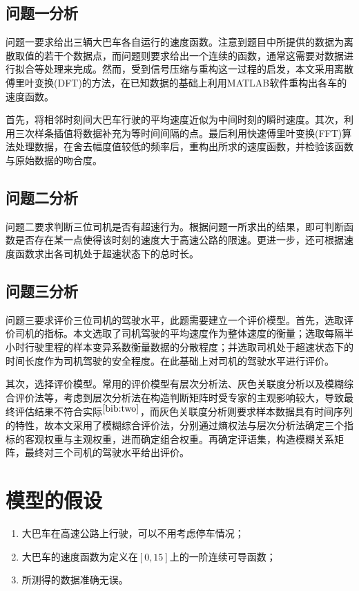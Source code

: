 \documentclass[bwprint]{cumcmthesis}
\begin{document}
        \subsection{问题一分析}
        问题一要求给出三辆大巴车各自运行的速度函数。注意到题目中所提供的数据为离散取值的若干个数据点，而问题则要求给出一个连续的函数，通常这需要对数据进行拟合等处理来完成。然而，受到信号压缩与重构这一过程的启发，本文采用离散傅里叶变换(DFT)的方法，在已知数据的基础上利用MATLAB软件重构出各车的速度函数。

        首先，将相邻时刻间大巴车行驶的平均速度近似为中间时刻的瞬时速度。其次，利用三次样条插值将数据补充为等时间间隔的点。最后利用快速傅里叶变换(FFT)算法处理数据，在舍去幅度值较低的频率后，重构出所求的速度函数，并检验该函数与原始数据的吻合度。

        \subsection{问题二分析}
        问题二要求判断三位司机是否有超速行为。根据问题一所求出的结果，即可判断函数是否存在某一点使得该时刻的速度大于高速公路的限速。更进一步，还可根据速度函数求出各司机处于超速状态下的总时长。
        \subsection{问题三分析}
        问题三要求评价三位司机的驾驶水平，此题需要建立一个评价模型。首先，选取评价司机的指标。本文选取了司机驾驶的平均速度作为整体速度的衡量；选取每隔半小时行驶里程的样本变异系数衡量数据的分散程度；并选取司机处于超速状态下的时间长度作为司机驾驶的安全程度。在此基础上对司机的驾驶水平进行评价。
        
        其次，选择评价模型。常用的评价模型有层次分析法、灰色关联度分析以及模糊综合评价法等，考虑到层次分析法在构造判断矩阵时受专家的主观影响较大，导致最终评估结果不符合实际$^{\cite{bib:two}}$，而灰色关联度分析则要求样本数据具有时间序列的特性，故本文采用了模糊综合评价法，分别通过熵权法与层次分析法确定三个指标的客观权重与主观权重，进而确定组合权重。再确定评语集，构造模糊关系矩阵，最终对三个司机的驾驶水平给出评价。
    \section{模型的假设}
        \begin{enumerate}
            \item 大巴车在高速公路上行驶，可以不用考虑停车情况；
            \item 大巴车的速度函数为定义在$[0,15]$上的一阶连续可导函数；
            \item 所测得的数据准确无误。
        \end{enumerate}
\end{document}
